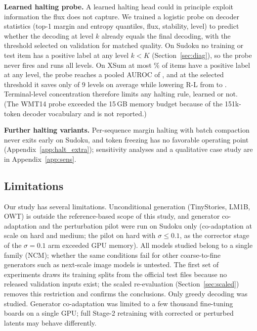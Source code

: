 \textbf{Learned halting probe.} A learned halting head could in principle exploit information the flux does not capture. We trained a logistic probe on decoder statistics (top-1 margin and entropy quantiles, flux, stability, level) to predict whether the decoding at level $k$ already equals the final decoding, with the threshold selected on validation for matched quality. On Sudoku no training or test item has a positive label at any level $k<K$ (Section~\ref{sec:diag}), so the probe never fires and runs all \PrHardLev{} levels. On XSum at most \PrXsumLab\% of items have a positive label at any level, the probe reaches a pooled AUROC of \PrXsumAuc, and at the selected threshold it saves only \PrXsumSave{} of 9 levels on average while lowering R-L from \PrXsumFull{} to \PrXsumQ. Terminal-level concentration therefore limits any halting rule, learned or not. (The WMT14 probe exceeded the 15\,GB memory budget because of the 151k-token decoder vocabulary and is not reported.)








\textbf{Further halting variants.} Per-sequence margin halting with batch compaction never exits early on Sudoku, and token freezing has no favorable operating point (Appendix~\ref{app:halt_extra}); sensitivity analyses and a qualitative case study are in Appendix~\ref{app:sens}.

\subsection{Limitations}
Our study has several limitations. Unconditional generation (TinyStories, LM1B, OWT) is outside the reference-based scope of this study, and generator co-adaptation and the perturbation pilot were run on Sudoku only (co-adaptation at scale on hard and medium; the pilot on hard with $\sigma\le0.1$, as the corrector stage of the $\sigma=0.1$ arm exceeded GPU memory). All models studied belong to a single family (NCM); whether the same conditions fail for other coarse-to-fine generators such as next-scale image models is untested. The first set of experiments draws its training splits from the official test files because no released validation inputs exist; the scaled re-evaluation (Section~\ref{sec:scaled}) removes this restriction and confirms the conclusions. Only greedy decoding was studied. Generator co-adaptation was limited to a few thousand fine-tuning boards on a single GPU; full Stage-2 retraining with corrected or perturbed latents may behave differently.


